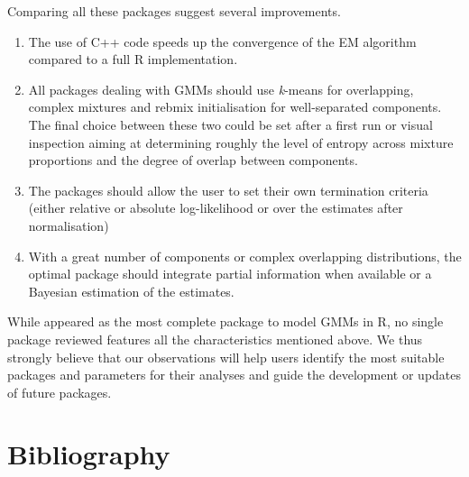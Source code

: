 Comparing all these packages suggest several improvements.

\begin{enumerate}
\def\labelenumi{\arabic{enumi}.}
\item
  The use of C++ code speeds up the convergence of the EM algorithm
  compared to a full R implementation.
\item
  All packages dealing with GMMs should use \emph{k}-means for overlapping, complex mixtures and rebmix initialisation for well-separated components. The final choice between these two could be set after a first run or visual
  inspection aiming at determining roughly the level of entropy across mixture proportions and the degree of overlap between components.
\item
  The packages should allow the user to set their own termination criteria (either relative or absolute log-likelihood or over the estimates after normalisation)
\item
  With a great number of components or complex overlapping distributions, the optimal package should integrate partial information when available or a Bayesian estimation of the
  estimates.
\end{enumerate}

While  appeared as the most complete package to model GMMs in R, no single package reviewed features all the characteristics mentioned above.
We thus strongly believe that our observations will help users identify the most suitable packages and parameters for their analyses and guide the
development or updates of future packages.

\hypertarget{bibliography}{%
\section{Bibliography}\label{bibliography}}

